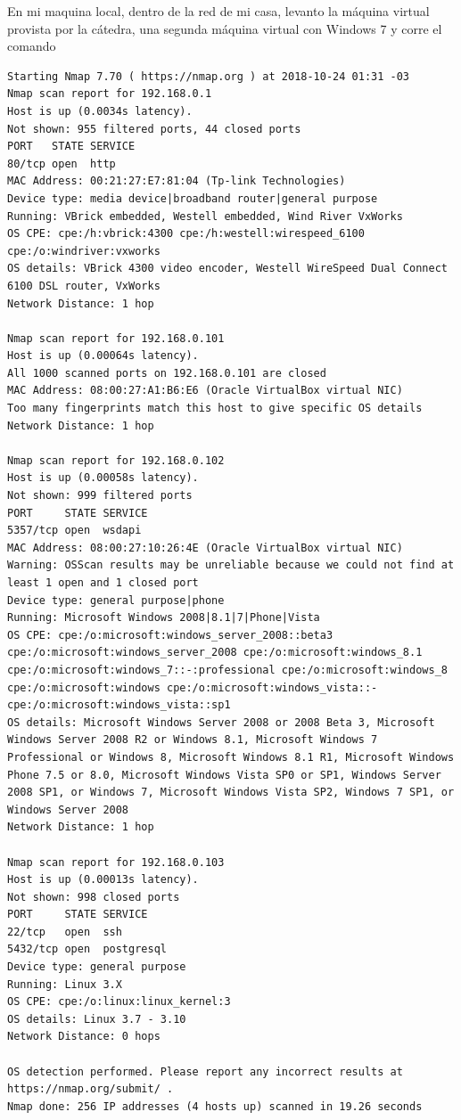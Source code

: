 En mi maquina local, dentro de la red de mi casa, levanto la máquina virtual provista por la cátedra, una segunda máquina virtual con Windows 7 y corre el comando

\begingroup
    \fontsize{9pt}{10pt}\selectfont
\begin{lstlisting}[breaklines=true]
Starting Nmap 7.70 ( https://nmap.org ) at 2018-10-24 01:31 -03
Nmap scan report for 192.168.0.1
Host is up (0.0034s latency).
Not shown: 955 filtered ports, 44 closed ports
PORT   STATE SERVICE
80/tcp open  http
MAC Address: 00:21:27:E7:81:04 (Tp-link Technologies)
Device type: media device|broadband router|general purpose
Running: VBrick embedded, Westell embedded, Wind River VxWorks
OS CPE: cpe:/h:vbrick:4300 cpe:/h:westell:wirespeed_6100 cpe:/o:windriver:vxworks
OS details: VBrick 4300 video encoder, Westell WireSpeed Dual Connect 6100 DSL router, VxWorks
Network Distance: 1 hop

Nmap scan report for 192.168.0.101
Host is up (0.00064s latency).
All 1000 scanned ports on 192.168.0.101 are closed
MAC Address: 08:00:27:A1:B6:E6 (Oracle VirtualBox virtual NIC)
Too many fingerprints match this host to give specific OS details
Network Distance: 1 hop

Nmap scan report for 192.168.0.102
Host is up (0.00058s latency).
Not shown: 999 filtered ports
PORT     STATE SERVICE
5357/tcp open  wsdapi
MAC Address: 08:00:27:10:26:4E (Oracle VirtualBox virtual NIC)
Warning: OSScan results may be unreliable because we could not find at least 1 open and 1 closed port
Device type: general purpose|phone
Running: Microsoft Windows 2008|8.1|7|Phone|Vista
OS CPE: cpe:/o:microsoft:windows_server_2008::beta3 cpe:/o:microsoft:windows_server_2008 cpe:/o:microsoft:windows_8.1 cpe:/o:microsoft:windows_7::-:professional cpe:/o:microsoft:windows_8 cpe:/o:microsoft:windows cpe:/o:microsoft:windows_vista::- cpe:/o:microsoft:windows_vista::sp1
OS details: Microsoft Windows Server 2008 or 2008 Beta 3, Microsoft Windows Server 2008 R2 or Windows 8.1, Microsoft Windows 7 Professional or Windows 8, Microsoft Windows 8.1 R1, Microsoft Windows Phone 7.5 or 8.0, Microsoft Windows Vista SP0 or SP1, Windows Server 2008 SP1, or Windows 7, Microsoft Windows Vista SP2, Windows 7 SP1, or Windows Server 2008
Network Distance: 1 hop

Nmap scan report for 192.168.0.103
Host is up (0.00013s latency).
Not shown: 998 closed ports
PORT     STATE SERVICE
22/tcp   open  ssh
5432/tcp open  postgresql
Device type: general purpose
Running: Linux 3.X
OS CPE: cpe:/o:linux:linux_kernel:3
OS details: Linux 3.7 - 3.10
Network Distance: 0 hops

OS detection performed. Please report any incorrect results at https://nmap.org/submit/ .
Nmap done: 256 IP addresses (4 hosts up) scanned in 19.26 seconds
    
\end{lstlisting}
\endgroup

